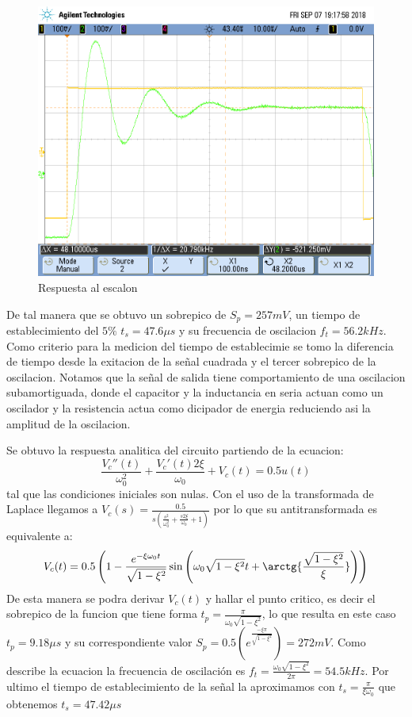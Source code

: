 \begin{figure}[h!]
\centering
\includegraphics[scale=0.25]{LRC2a.png}
\caption{Respuesta al escalon}
\label{fig:LRC2a}
\end{figure}

De tal manera que se obtuvo un sobrepico de $S_p = 257mV$, un tiempo de establecimiento del $5\%$ $t_s = 47.6{\mu}s$ y su frecuencia de oscilacion $f_t = 56.2kHz$. Como criterio para la medicion del tiempo de establecimie se tomo la diferencia de tiempo desde la exitacion de la señal cuadrada y el tercer sobrepico de la oscilacion. Notamos que la señal de salida tiene comportamiento de una oscilacion subamortiguada, donde el capacitor y la inductancia en seria actuan como un oscilador y la resistencia actua como dicipador de energia reduciendo asi la amplitud de la oscilacion.

Se obtuvo la respuesta analitica del circuito partiendo de la ecuacion: $$\frac{V_c''(t)}{\omega_0^2} + \frac{V_c'(t) 2\xi}{\omega_0} + V_c(t) =  0.5u(t)$$ tal que las condiciones iniciales son nulas. Con el uso de la transformada de Laplace llegamos a $V_c(s) = \frac{0.5}{s(\frac{s^2}{\omega_0^2}+\frac{s2\xi}{\omega_0}+1)}$ por lo que su antitransformada es equivalente a:$$V_c(t) = 0.5\left(1-\frac{e^{-\xi\omega_0t}}{\sqrt{1-\xi^2}}\sin{\left(\omega_0\sqrt{1-\xi^2}t+\arctg{\frac{\sqrt{{1-\xi^2}}}{\xi}}\right)}\right)$$ 
De esta manera se podra derivar $V_c(t)$ y hallar el punto critico, es decir el sobrepico de la funcion que tiene forma $t_p=\frac{\pi}{\omega_0\sqrt{1-\xi^2}}$, lo que resulta en este caso $t_p=9.18{\mu}s$ y su correspondiente valor $S_p=0.5\left(e^{\frac{-\xi\pi}{\sqrt{1-\xi^2}}}\right) =272mV$. Como describe la ecuacion la frecuencia de oscilación es $f_t= \frac{\omega_0\sqrt{1-\xi^2}}{2\pi} = 54.5kHz$. Por ultimo el tiempo de establecimiento de la señal la aproximamos con $t_s=\frac{\pi}{\xi\omega_0}$ que obtenemos $t_s = 47.42{\mu}s$

